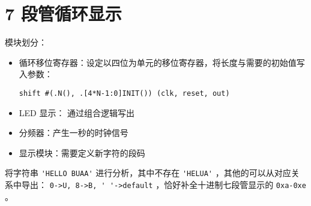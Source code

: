 \documentclass[lang=cn,11pt,a4paper,cite=authoryear]{elegantpaper}
\begin{document}
\section{7 段管循环显示}

模块划分：

\begin{itemize}
    \item 循环移位寄存器：设定以四位为单元的移位寄存器，将长度与需要的初始值写入参数：

    \lstinline{shift #(.N(), .[4*N-1:0]INIT()) (clk, reset, out)} 
    \item LED 显示： 通过组合逻辑写出
    \item 分频器：产生一秒的时钟信号
    \item 显示模块：需要定义新字符的段码
\end{itemize}

将字符串 \lstinline{'HELLO BUAA'} 进行分析，其中不存在 \lstinline{'HELUA'} ，其他的可以从对应关系中导出： \lstinline{0->U, 8->B, ' '->default} ，恰好补全十进制七段管显示的 \lstinline{0xa-0xe} 。
\end{document}
